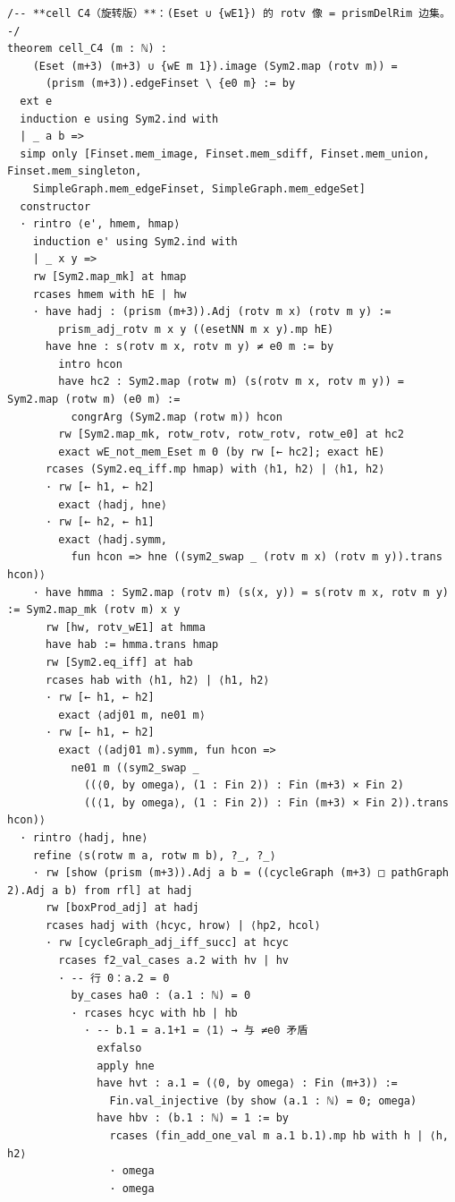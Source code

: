 \documentclass[11pt]{article}
\begin{document}
\begin{lstlisting}
/-- **cell C4（旋转版）**：(Eset ∪ {wE1}) 的 rotv 像 = prismDelRim 边集。 -/
theorem cell_C4 (m : ℕ) :
    (Eset (m+3) (m+3) ∪ {wE m 1}).image (Sym2.map (rotv m)) =
      (prism (m+3)).edgeFinset \ {e0 m} := by
  ext e
  induction e using Sym2.ind with
  | _ a b =>
  simp only [Finset.mem_image, Finset.mem_sdiff, Finset.mem_union, Finset.mem_singleton,
    SimpleGraph.mem_edgeFinset, SimpleGraph.mem_edgeSet]
  constructor
  · rintro ⟨e', hmem, hmap⟩
    induction e' using Sym2.ind with
    | _ x y =>
    rw [Sym2.map_mk] at hmap
    rcases hmem with hE | hw
    · have hadj : (prism (m+3)).Adj (rotv m x) (rotv m y) :=
        prism_adj_rotv m x y ((esetNN m x y).mp hE)
      have hne : s(rotv m x, rotv m y) ≠ e0 m := by
        intro hcon
        have hc2 : Sym2.map (rotw m) (s(rotv m x, rotv m y)) = Sym2.map (rotw m) (e0 m) :=
          congrArg (Sym2.map (rotw m)) hcon
        rw [Sym2.map_mk, rotw_rotv, rotw_rotv, rotw_e0] at hc2
        exact wE_not_mem_Eset m 0 (by rw [← hc2]; exact hE)
      rcases (Sym2.eq_iff.mp hmap) with ⟨h1, h2⟩ | ⟨h1, h2⟩
      · rw [← h1, ← h2]
        exact ⟨hadj, hne⟩
      · rw [← h2, ← h1]
        exact ⟨hadj.symm,
          fun hcon => hne ((sym2_swap _ (rotv m x) (rotv m y)).trans hcon)⟩
    · have hmma : Sym2.map (rotv m) (s(x, y)) = s(rotv m x, rotv m y) := Sym2.map_mk (rotv m) x y
      rw [hw, rotv_wE1] at hmma
      have hab := hmma.trans hmap
      rw [Sym2.eq_iff] at hab
      rcases hab with ⟨h1, h2⟩ | ⟨h1, h2⟩
      · rw [← h1, ← h2]
        exact ⟨adj01 m, ne01 m⟩
      · rw [← h1, ← h2]
        exact ⟨(adj01 m).symm, fun hcon =>
          ne01 m ((sym2_swap _
            ((⟨0, by omega⟩, (1 : Fin 2)) : Fin (m+3) × Fin 2)
            ((⟨1, by omega⟩, (1 : Fin 2)) : Fin (m+3) × Fin 2)).trans hcon)⟩
  · rintro ⟨hadj, hne⟩
    refine ⟨s(rotw m a, rotw m b), ?_, ?_⟩
    · rw [show (prism (m+3)).Adj a b = ((cycleGraph (m+3) □ pathGraph 2).Adj a b) from rfl] at hadj
      rw [boxProd_adj] at hadj
      rcases hadj with ⟨hcyc, hrow⟩ | ⟨hp2, hcol⟩
      · rw [cycleGraph_adj_iff_succ] at hcyc
        rcases f2_val_cases a.2 with hv | hv
        · -- 行 0：a.2 = 0
          by_cases ha0 : (a.1 : ℕ) = 0
          · rcases hcyc with hb | hb
            · -- b.1 = a.1+1 = ⟨1⟩ → 与 ≠e0 矛盾
              exfalso
              apply hne
              have hvt : a.1 = (⟨0, by omega⟩ : Fin (m+3)) :=
                Fin.val_injective (by show (a.1 : ℕ) = 0; omega)
              have hbv : (b.1 : ℕ) = 1 := by
                rcases (fin_add_one_val m a.1 b.1).mp hb with h | ⟨h, h2⟩
                · omega
                · omega

\end{lstlisting}
\end{document}
